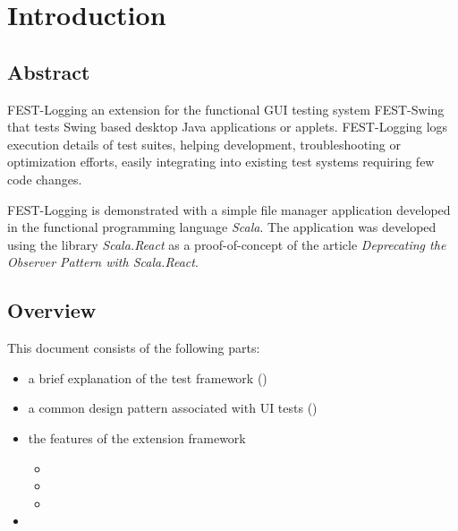 
\chapter{Introduction}\label{chap:intro}

\section{Abstract}\label{sec:abstract}

FEST-Logging an extension for the functional GUI testing system FEST-Swing that tests Swing based desktop Java applications or applets. FEST-Logging logs execution details of test suites, helping development, troubleshooting or optimization efforts, easily integrating into existing test systems requiring few code changes.

FEST-Logging is demonstrated with a simple file manager application developed in the functional programming language \emph{Scala}. The application was developed using the library \emph{Scala.React} as a proof-of-concept of the article \emph{Deprecating the Observer Pattern with Scala.React}\cite{DeprecatingObservers}.

\section{Overview}\label{sec:overview}

This document consists of the following parts:
\begin{itemize}
\item a brief explanation of the test framework ()
\item a common design pattern associated with UI tests ()
\item the features of the extension framework
	\begin{itemize}
	\item {}
	\item {}
	\item {}
	\end{itemize}
\item {}
\end{itemize}

